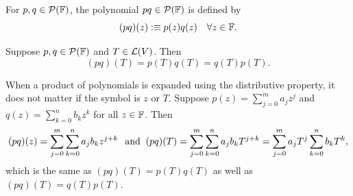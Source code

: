 \begin{mydef}
  For $p, q \in \mathcal{P}(\mathbb{F})$, the polynomial $pq \in \mathcal{P}(\mathbb{F})$ is defined by
  \begin{equation}
    (pq)(z) :\equiv p(z)q(z) \quad \forall z \in \mathbb{F}.
  \end{equation}
\end{mydef}

\setcounter{thm}{16}
\begin{thm} 
  \label{multiplicative-properties}
  Suppose $p,q \in \mathcal{P} (\mathbb{F})$ and $T\in \mathcal{L} (V)$. Then
  \begin{equation}
    (p q)(T) = p(T) q(T) = q(T)p(T).
  \end{equation}
\end{thm}
\begin{prf} When a product of polynomials is expanded using the distributive property, it does not matter if the symbol is $z$ or $T$. Suppose $p(z) = \sum_{j=0}^{m} a_j z^j$ and $q(z)=\sum_{k=0}^{n} b_k z^k$ for all $z \in \mathbb{F}$. Then %
  \begin{equation}
    (pq)(z) = \sum_{j=0}^{m} \sum_{k=0}^{n} a_j b_k z^{j+k} \;\;\, \text{and}\;\;
    (pq)(T) = \sum_{j=0}^{m} \sum_{k=0}^{n} a_j b_k T^{j+k}
    = \sum_{j=0}^{m} a_j T^j \sum_{k=0}^{n}  b_k T^k,
  \end{equation}
  which is the same as $(pq)(T) = p(T)q(T)$ as well as $(pq)(T) = q(T)p(T)$.
\end{prf}


